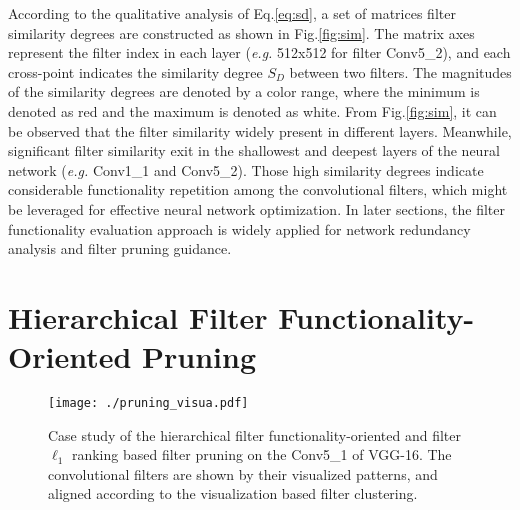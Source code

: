 \documentclass{article} %
\begin{document}
According to the qualitative analysis of Eq.\ref{eq:sd}, a set of matrices filter similarity degrees are constructed as shown in Fig.\ref{fig:sim}.
	The matrix axes represent the filter index in each layer (\textit{e.g.} 512x512 for filter Conv5\_2), and each cross-point indicates the similarity degree $S_{D}$ between two filters.
	The magnitudes of the similarity degrees are denoted by a color range, where the minimum is denoted as red and the maximum is denoted as white.
	From Fig.\ref{fig:sim}, it can be observed that the filter similarity widely present in different layers.
	Meanwhile, significant filter similarity exit in the shallowest and deepest layers of the neural network (\textit{e.g.} Conv1\_1 and Conv5\_2).
	Those high similarity degrees indicate considerable functionality repetition among the convolutional filters, which might be leveraged for effective neural network optimization.
In later sections, the filter functionality evaluation approach is widely applied for network redundancy analysis and filter pruning guidance.
\section{Hierarchical Filter Functionality-Oriented Pruning}\label{sec:pruning}\begin{figure}[t]
	\centering
	\texttt{[image: ./pruning\_visua.pdf]}
	\caption*{\hspace{1mm}(a) Proposed functionality-oriented filter pruning. \hspace{10mm} (b) $\ell_1$ ranking based filter pruning.}
	\caption{Case study of the hierarchical filter functionality-oriented  and filter $\ell_1$ ranking based filter pruning on the Conv5\_1 of VGG-16.
		The convolutional filters are shown by their visualized patterns, and aligned according to the visualization based filter clustering.}
	\label{fig:pruning}
\end{figure}
\end{document}
